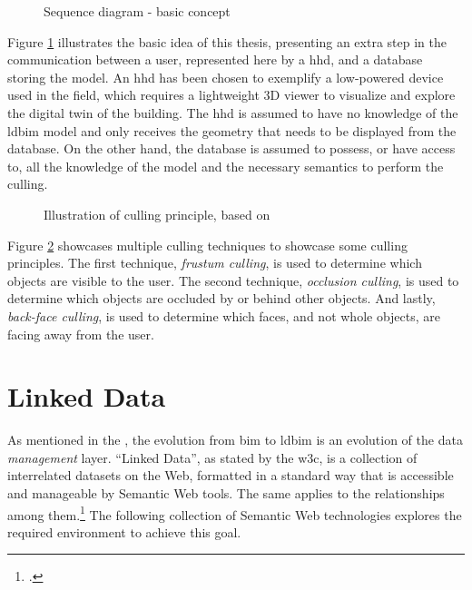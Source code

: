 \begin{figure}[h]
	\centering
	
	\caption{Sequence diagram - basic concept}
	\label{fig:firstIdea}
\end{figure}

Figure \ref{fig:firstIdea} illustrates the basic idea of this thesis, presenting an extra step in the communication between a user, represented here by a \ac{hhd}, and a database storing the model. An \ac{hhd} has been chosen to exemplify a low-powered device used in the field, which requires a lightweight 3D viewer to visualize and explore the digital twin of the building. The \ac{hhd} is assumed to have no knowledge of the \ac{ldbim} model and only receives the geometry that needs to be displayed from the database. On the other hand, the database is assumed to possess, or have access to, all the knowledge of the model and the necessary semantics to perform the culling.

\begin{figure}[h]
	\centering
	
	\caption{Illustration of culling principle, based on \cite{CullingPrinciples}}
	\label{fig:cullingPrinciple}
\end{figure}

Figure \ref{fig:cullingPrinciple} showcases multiple culling techniques to showcase some culling principles. The first technique, \emph{frustum culling}, is used to determine which objects are visible to the user. The second technique, \emph{occlusion culling}, is used to determine which objects are occluded by or behind other objects. And lastly, \emph{back-face culling}, is used to determine which faces, and not whole objects, are facing away from the user.

\section{Linked Data}

As mentioned in the , the evolution from \ac{bim} to \ac{ldbim} is an evolution of the data \emph{management} layer. \enquote{Linked Data}, as stated by the \ac{w3c}, is a collection of interrelated datasets on the Web, formatted in a standard way that is accessible and manageable by Semantic Web tools. The same applies to the relationships among them.\footcite{w3c} The following collection of Semantic Web technologies explores the required environment to achieve this goal.


